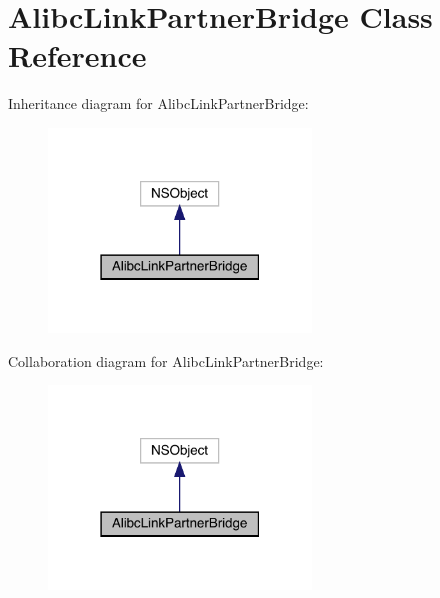 \hypertarget{interface_alibc_link_partner_bridge}{}\section{Alibc\+Link\+Partner\+Bridge Class Reference}
\label{interface_alibc_link_partner_bridge}


Inheritance diagram for Alibc\+Link\+Partner\+Bridge\+:\nopagebreak
\begin{figure}[H]
\begin{center}
\leavevmode
\includegraphics[width=198pt]{interface_alibc_link_partner_bridge__inherit__graph}
\end{center}
\end{figure}


Collaboration diagram for Alibc\+Link\+Partner\+Bridge\+:\nopagebreak
\begin{figure}[H]
\begin{center}
\leavevmode
\includegraphics[width=198pt]{interface_alibc_link_partner_bridge__coll__graph}
\end{center}
\end{figure}
